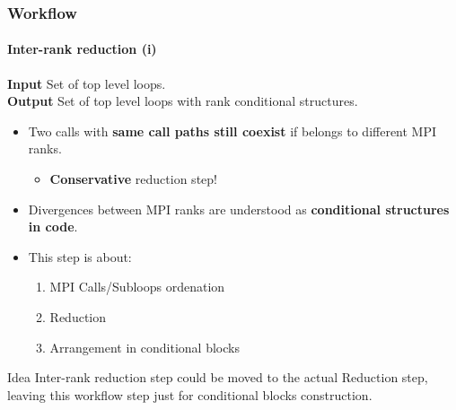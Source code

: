 \documentclass{beamer}
\begin{document}
\begin{frame}
\frametitle{Workflow}
\framesubtitle{Inter-rank reduction (i)}
\textbf{Input} Set of top level loops.\\
\textbf{Output} Set of top level loops with rank conditional structures.\\
\vspace{10px}
\pause
\begin{itemize}
	\item Two calls with \textbf{same call paths still coexist} if belongs to different MPI ranks.
	\begin{itemize}
		\item \textbf{Conservative} reduction step!
	\end{itemize}
	\item Divergences between MPI ranks are understood as \textbf{conditional structures in code}.
	\item This step is about: 
	\begin{enumerate}
		\item MPI Calls/Subloops ordenation
		\item Reduction
		\item Arrangement in conditional blocks
	\end{enumerate}
\end{itemize}
\pause
\begin{block}{Idea}
	Inter-rank reduction step could be moved to the actual Reduction step, leaving this workflow step just for conditional blocks construction.
\end{block}
\end{frame}

%
\end{document}

